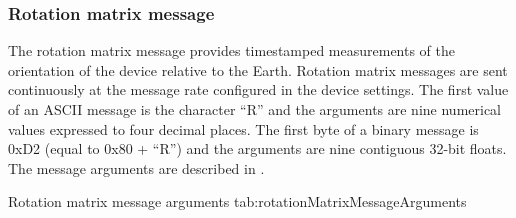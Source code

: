\subsubsection{Rotation matrix message}

The rotation matrix message provides timestamped measurements of the orientation of the device relative to the Earth.  Rotation matrix messages are sent continuously at the message rate configured in the device settings.  The first value of an \ac{ASCII} message is the character \enquote{R} and the arguments are nine numerical values expressed to four decimal places.  The first byte of a binary message is 0xD2 (equal to 0x80 + \enquote{R}) and the arguments are nine contiguous 32-bit floats.  The message arguments are described in .

\begingroup
    \def\tempArgumentA{Rotation matrix XX element}
    \def\tempArgumentB{Rotation matrix XY element}
    \def\tempArgumentC{Rotation matrix XZ element}
    \def\tempArgumentD{Rotation matrix YX element}
    \def\tempArgumentE{Rotation matrix YY element}
    \def\tempArgumentF{Rotation matrix YZ element}
    \def\tempArgumentG{Rotation matrix ZX element}
    \def\tempArgumentH{Rotation matrix ZY element}
    \def\tempArgumentI{Rotation matrix ZZ element}
    \dataMessageTable
    {Rotation matrix message arguments}
    {tab:rotationMatrixMessageArguments}
\endgroup

\begingroup
    \def\tempNameA{Rotation matrix XX element}
    \def\tempNameB{Rotation matrix XY element}
    \def\tempNameC{Rotation matrix XZ element}
    \def\tempNameD{Rotation matrix YX element}
    \def\tempNameE{Rotation matrix YY element}
    \def\tempNameF{Rotation matrix YZ element}
    \def\tempNameG{Rotation matrix ZX element}
    \def\tempNameH{Rotation matrix ZY element}
    \def\tempNameI{Rotation matrix ZZ element}
    \def\tempValueA{1}
    \def\tempValueB{0}
    \def\tempValueC{0}
    \def\tempValueD{0}
    \def\tempValueE{1}
    \def\tempValueF{0}
    \def\tempValueG{0}
    \def\tempValueH{0}
    \def\tempValueI{1}
    \def\tempAsciiFirst{R}
    \def\tempAsciiA{1.0000}
    \def\tempAsciiB{0.0000}
    \def\tempAsciiC{0.0000}
    \def\tempAsciiD{0.0000}
    \def\tempAsciiE{1.0000}
    \def\tempAsciiF{0.0000}
    \def\tempAsciiG{0.0000}
    \def\tempAsciiH{0.0000}
    \def\tempAsciiI{1.\linebreak0000} %
    \def\tempBinaryFirst{D2}
    \def\tempBinaryA{00 00 80 3F}
    \def\tempBinaryB{00 00 00 00}
    \def\tempBinaryC{00 00 00 00}
    \def\tempBinaryD{00 00 00 00}
    \def\tempBinaryE{00 00 80 3F}
    \def\tempBinaryF{00 00 00 00}
    \def\tempBinaryG{00 00 00 00}
    \def\tempBinaryH{00 00 00 00}
    \def\tempBinaryI{00 00 80 3F}
    \dataMessageExample
\endgroup

